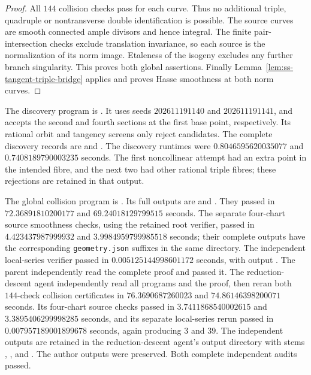 \begin{proof}
All $144$ collision checks pass for each curve. Thus no additional
triple, quadruple or nontransverse double identification is possible.
The source curves are smooth connected ample divisors and hence
integral. The finite pair-intersection checks exclude translation
invariance, so each source is the normalization of its norm image.
Etaleness of the isogeny excludes any further branch singularity.
This proves both global assertions. Finally
Lemma~\ref{lem:ss-tangent-triple-bridge} applies and proves Hasse
smoothness at both norm curves.
\end{proof}

\begin{remark}\label{auto:A_monodromy:ac724428800d}

The discovery program is
.
It uses seeds $202611191140$ and $202611191141$, and accepts the
second and fourth sections at the first base point, respectively.
Its rational orbit and tangency screens only reject candidates.
The complete discovery records are
 and
.
The discovery runtimes were $0.8046595620035077$ and
$0.7408189790003235$ seconds. The first noncollinear attempt had an
extra point in the intended fibre, and the next two had other rational
triple fibres; these rejections are retained in that output.

The global collision program is
.
Its full outputs are
and
.
They passed in $72.36891810200177$ and $69.24018129799515$ seconds.
The separate four-chart source smoothness checks, using the retained
root verifier, passed in $4.423437987999932$ and $3.9984959799985518$
seconds; their complete outputs have the corresponding
\texttt{geometry.json} suffixes in the same directory.
The independent local-series verifier passed in
$0.005125144998601172$ seconds, with output
.
The parent independently read the complete proof and passed it. The
reduction-descent agent independently read all programs and the proof,
then reran both $144$-check collision certificates in
$76.3690687260023$ and $74.86146398200071$ seconds. Its four-chart
source checks passed in $3.7411868540002615$ and
$3.3895406299998285$ seconds, and its separate local-series rerun
passed in $0.007957189001899678$ seconds, again producing $3$ and $39$.
The independent outputs are retained in the reduction-descent agent's
output directory with stems
,
, and
. The author outputs were
preserved. Both complete independent audits passed.
\end{remark}


